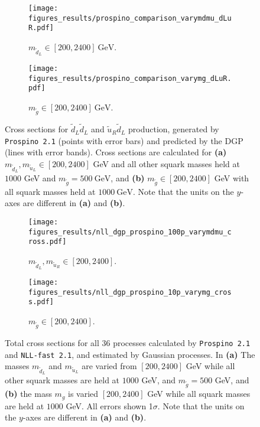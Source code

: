 \documentclass[twoside,english]{uiofysmaster}
\begin{document}
{{\begin{figure}
    \centering
    \begin{subfigure}[b]{0.9\textwidth}
        \texttt{[image: figures\_results/prospino\_comparison\_varymdmu\_dLuR.pdf]}
\caption{$m_{\widetilde{d}_L} \in[200, 2400]~\mathrm{GeV}$.}
\label{Fig:: results : dLuL uLuL prospino dgp}
    \end{subfigure}

    \begin{subfigure}[b]{0.9\textwidth}
    \centering
        \texttt{[image: figures\_results/prospino\_comparison\_varymg\_dLuR.pdf]}
\caption{$m_{\widetilde{g}}\in[200, 2400]~\mathrm{GeV}$.}
\label{Fig:: results : dLuL uLuL prospino dgp varymg}
    \end{subfigure}

    \caption{Cross sections for $\widetilde{d}_L \widetilde{d}_L$ and $\widetilde{u}_R \widetilde{d}_L$ production, generated by {\tt Prospino 2.1} (points with error bars) and predicted by the DGP (lines with error bands). Cross sections are calculated for \textbf{(a)} $m_{\widetilde{d}_L}, m_{\widetilde{u}_L} \in [200, 2400]$ GeV and all other squark masses held at $1000$ GeV and $m_{\tilde{g}}=500~\mathrm{GeV}$, and \textbf{(b)} $m_{\tilde{g}} \in [200, 2400]$ GeV with all squark masses held at $ 1000~\mathrm{GeV}$. Note that the units on the $y$-axes are different in \textbf{(a)} and \textbf{(b)}.}\label{Fig:: results : dLuR dLdL cross sections}
\end{figure}


\begin{figure}
    \centering
    \begin{subfigure}[b]{0.9\textwidth}
        \texttt{[image: figures\_results/nll\_dgp\_prospino\_100p\_varymdmu\_cross.pdf]}
\caption{$m_{\widetilde{d}_L}, m_{\widetilde{u}_R} \in [200, 2400]$.}
\label{Fig:: results : total prospino dgp vary mdL}
    \end{subfigure}

    \begin{subfigure}[b]{0.9\textwidth}
    \centering
        \texttt{[image: figures\_results/nll\_dgp\_prospino\_10p\_varymg\_cross.pdf]}
\caption{$m_{\widetilde{g}} \in [200, 2400]$.}
\label{Fig:: results : total prospino dgp varymg}
    \end{subfigure}

    \caption{Total cross sections for all 36 processes calculated by {\tt Prospino 2.1} and {\tt NLL-fast 2.1}, and estimated by Gaussian processes. In \textbf{(a)} The masses $m_{\widetilde{d}_L}$ and $m_{\widetilde{u}_L}$ are varied from $[200, 2400]$ GeV while all other squark masses are held at $1000$ GeV, and $m_{\widetilde{g}}=500$ GeV, and \textbf{(b)} the mass $m_{g}$ is varied $[200, 2400]$ GeV while all squark masses are held at $1000$ GeV. All errors shown 1$\sigma$. Note that the units on the $y$-axes are different in \textbf{(a)} and \textbf{(b)}.}\label{Fig:: results : total cross sections}
\end{figure}





}}
\end{document}
